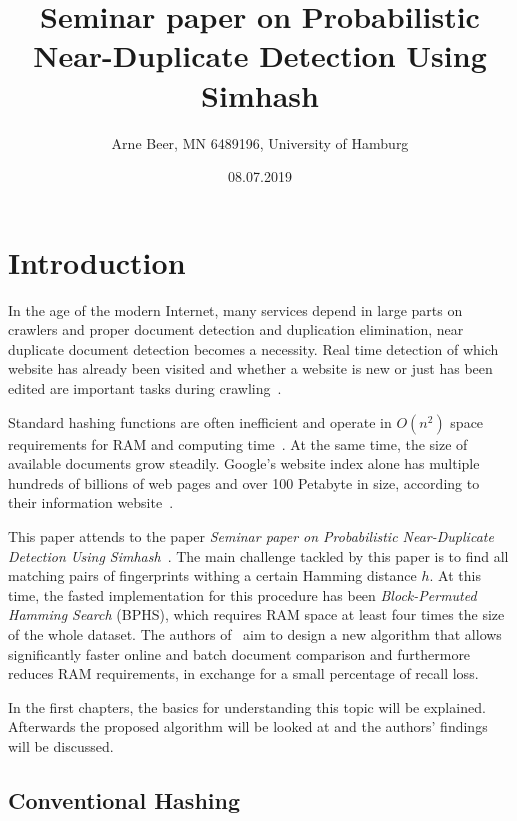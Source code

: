 \documentclass[12pt,a4paper,DIV=calc]{scrartcl}
\begin{document}
\title{Seminar paper on Probabilistic Near-Duplicate Detection Using Simhash}
\author{Arne Beer, MN 6489196, University of Hamburg}
\date{08.07.2019}

\maketitle


\section{Introduction}

In the age of the modern Internet, many services depend in large parts on crawlers and proper document detection and duplication elimination, near duplicate document detection becomes a necessity.
Real time detection of which website has already been visited and whether a website is new or just has been edited are important tasks during crawling~\cite{paper:scaling_six_billion}.

Standard hashing functions are often inefficient and operate in $O(n^2)$ space requirements for RAM and computing time~\cite{book:hashing}.
At the same time, the size of available documents grow steadily.
Google's website index alone has multiple hundreds of billions of web pages and over 100 Petabyte in size, according to their information website~\cite{info:google_stats}.

This paper attends to the paper \emph{Seminar paper on Probabilistic Near-Duplicate Detection Using Simhash}~\cite{inproc:main}.
The main challenge tackled by this paper is to find all matching pairs of fingerprints withing a certain Hamming distance $h$.
At this time, the fasted implementation for this procedure has been \emph{Block-Permuted Hamming Search} (BPHS), which requires RAM space at least four times the size of the whole dataset.
The authors of~\cite{inproc:main} aim to design a new algorithm that allows significantly faster online and batch document comparison and furthermore reduces RAM requirements, in exchange for a small percentage of recall loss.

In the first chapters, the basics for understanding this topic will be explained.
Afterwards the proposed algorithm will be looked at and the authors' findings will be discussed.

\subsection{Conventional Hashing}
\end{document}
